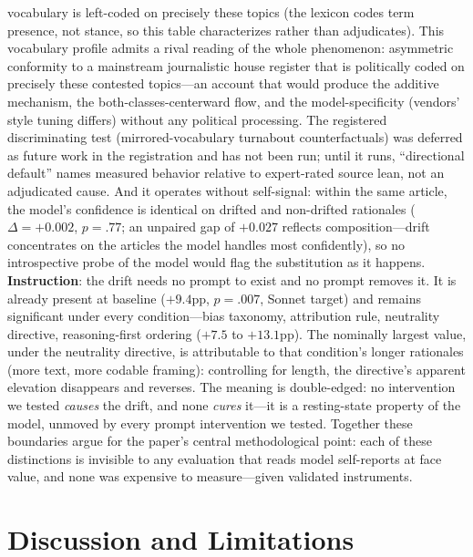 \documentclass{article}
\begin{document}
vocabulary is left-coded on precisely these topics (the lexicon codes
term presence, not stance, so this table characterizes rather than
adjudicates). This vocabulary profile admits a rival reading of the
whole phenomenon: asymmetric conformity to a mainstream journalistic
house register that is politically coded on precisely these contested
topics---an account that would produce the additive mechanism, the
both-classes-centerward flow, and the model-specificity (vendors' style
tuning differs) without any political processing. The registered
discriminating test (mirrored-vocabulary turnabout counterfactuals) was
deferred as future work in the registration and has not been run; until
it runs, ``directional default'' names measured behavior relative to
expert-rated source lean, not an adjudicated cause. And it operates without self-signal: within the same
article, the model's confidence is identical on drifted and non-drifted
rationales ($\Delta=+0.002$, $p=.77$; an unpaired gap of $+0.027$
reflects composition---drift concentrates on the articles the model
handles most confidently), so no introspective probe of the model would
flag the substitution as it happens.
\textbf{Instruction}: the drift needs no prompt to exist and no prompt
removes it. It is already present at baseline ($+9.4$pp, $p=.007$,
Sonnet target) and remains significant under every condition---bias taxonomy,
attribution rule, neutrality directive, reasoning-first ordering
($+7.5$ to $+13.1$pp). The nominally largest value, under the
neutrality directive, is attributable to that condition's longer rationales
(more text, more codable framing): controlling for length, the
directive's apparent elevation disappears and reverses. The meaning is
double-edged: no intervention we tested \emph{causes} the drift, and
none \emph{cures} it---it is a resting-state property of the model,
unmoved by every prompt intervention we tested. Together
these boundaries argue for the paper's central methodological point:
each of these distinctions is invisible to any evaluation that reads
model self-reports at face value, and none was expensive to
measure---given validated instruments.

\section{Discussion and Limitations}
\label{sec:discussion}
\end{document}

